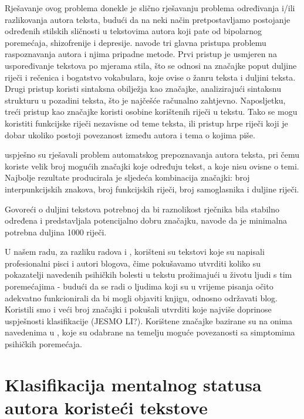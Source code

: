\documentclass[10pt, a4paper]{article}
\begin{document}
Rješavanje ovog problema donekle je slično rješavanju problema određivanja i/ili razlikovanja autora teksta, budući da na neki način pretpostavljamo postojanje određenih stilskih sličnosti u tekstovima autora koji pate od bipolarnog poremećaja, shizofrenije i depresije. \citet{coyotl} navode tri glavna pristupa problemu raspoznavanja autora i njima pripadne metode. Prvi pristup je usmjeren na uspoređivanje tekstova po mjerama stila, što se odnosi na značajke poput duljine riječi i rečenica i bogatstvo vokabulara, koje ovise o žanru teksta i duljini teksta. Drugi pristup koristi sintaksna obilježja kao značajke, analizirajući sintaksnu strukturu u pozadini teksta, što je najčešće računalno zahtjevno. Naposljetku, treći pristup kao značajke koristi osobine korištenih riječi u tekstu. Tako se mogu koristiti funkcijske riječi nezavisne od teme teksta, ili pristup hrpe riječi koji je dobar ukoliko postoji povezanost između autora i tema o kojima piše.


\citet{kristo} uspješno su rješavali problem automatskog prepoznavanja autora teksta, pri čemu koriste velik broj mogućih značajki koje određuju tekst, a koje nisu ovisne o temi. Najbolje rezultate producirala je sljedeća kombinacija značajki: broj interpunkcijskih znakova, broj funkcijskih riječi, broj samoglasnika i duljine riječi.

Govoreći o duljini tekstova potrebnoj da bi raznolikost rječnika bila stabilno određena i predstavljala potencijalno dobru značajku, \citet{tweedie} navode da je minimalna potrebna duljina 1000 riječi.

U našem radu, za razliku radova \citep{strous-2009} i \citep{exray}, korišteni su tekstovi koje su napisali profesionalni pisci i autori blogova, čime pokušavamo utvrditi koliko su pokazatelji navedenih psihičkih bolesti u tekstu prožimajući u životu ljudi s tim poremećajima - budući da se radi o ljudima koji su u vrijeme pisanja očito adekvatno funkcionirali da bi mogli objaviti knjigu, odnosno održavati blog. Koristili smo i veći broj značajki i pokušali utvrditi koje najviše doprinose uspješnosti klasifikacije (JESMO LI?). Korištene značajke bazirane su na onima navedenima u \citep{kristo}, koje su odabrane na temelju moguće povezanosti sa simptomima psihičkih poremećaja.


\section{Klasifikacija mentalnog statusa autora koristeći tekstove}
\end{document}

